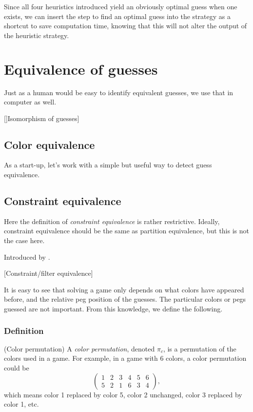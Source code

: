 Since all four heuristics introduced yield an obviously optimal guess when one exists, we can insert the step to find an optimal guess into the strategy as a shortcut to save computation time, knowing that this will not alter the output of the heuristic strategy.

\section{Equivalence of guesses}

Just as a human would be easy to identify equivalent guesses, we use that in computer as well.

[]Isomorphism of guesses]

\subsection{Color equivalence}

As a start-up, let's work with a simple but useful way to detect guess equivalence.

\subsection{Constraint equivalence}

Here the definition of \emph{constraint equivalence} is rather restrictive. Ideally, constraint equivalence should be the same as partition equivalence, but this is not the case here.

Introduced by \cite{neuwirth81,koyama93}. 

[Constraint/filter equivalence]

It is easy to see that solving a game only depends on what colors have appeared before, and the relative peg position of the guesses. The particular colors or pegs guessed are not important. From this knowledge, we define the following.

\subsubsection{Definition}

\begin{definition}
(Color permutation) A \emph{color permutation}, denoted $\pi_c$, is a permutation of the colors used in a game. For example, in a game with 6 colors, a color permutation could be
\[
\begin{pmatrix}
1 & 2 & 3 & 4 & 5 & 6 \\
5 & 2 & 1 & 6 & 3 & 4
\end{pmatrix} ,
\]
which means color 1 replaced by color 5, color 2 unchanged, color 3 replaced by color 1, etc.
\end{definition}

